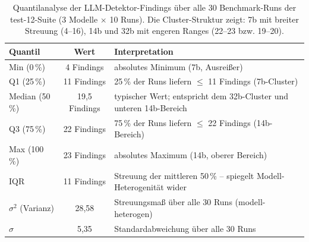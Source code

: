 \begin{table}[htbp]
\centering
\setlength{\tabcolsep}{3.5pt}
\renewcommand{\arraystretch}{1.15}
\caption[Beispielzeilen aus dem CSV-Export (test-12)]{Repräsentative Beispielzeilen aus \texttt{results/benchmark/summary.csv} (test-12-Suite; jeweils Run~01 pro Modell).}
%
\label{tab:csv_beispiel}
\end{table}

\clearpage

\label{app:statistik_quantile_12}

\begin{table}[htbp]
\centering
\setlength{\tabcolsep}{4pt}
\renewcommand{\arraystretch}{1.2}
\caption[Quantilanalyse der LLM-Findings (test-12, alle 30 Runs)]{Quantilanalyse der LLM-Detektor-Findings über alle 30 Benchmark-Runs der test-12-Suite (3 Modelle $\times$ 10 Runs). Die Cluster-Struktur zeigt: 7b mit breiter Streuung (4--16), 14b und 32b mit engeren Ranges (22--23 bzw. 19--20).}
\begin{tabular}{|l|c|p{7cm}|}
\hline
\textbf{Quantil} & \textbf{Wert} & \textbf{Interpretation} \\
\hline
Min (0\,\%)     & 4 Findings  & absolutes Minimum (7b, Ausreißer) \\
\hline
Q1 (25\,\%)     & 11 Findings & 25\,\% der Runs liefern $\leq$ 11 Findings (7b-Cluster) \\
\hline
Median (50\,\%) & 19{,}5 Findings & typischer Wert; entspricht dem 32b-Cluster und unteren 14b-Bereich \\
\hline
Q3 (75\,\%)     & 22 Findings & 75\,\% der Runs liefern $\leq$ 22 Findings (14b-Bereich) \\
\hline
Max (100\,\%)   & 23 Findings & absolutes Maximum (14b, oberer Bereich) \\
\hline
\ac{IQR}             & 11 Findings & Streuung der mittleren 50\,\% -- spiegelt Modell-Heterogenität wider \\
\hline
$\sigma^2$ (Varianz) & 28{,}58     & Streuungsmaß über alle 30 Runs (modell-heterogen) \\
\hline
$\sigma$             &  5{,}35     & Standardabweichung über alle 30 Runs \\
\hline
\end{tabular}
\label{tab:statistik_quantile}
\end{table}

